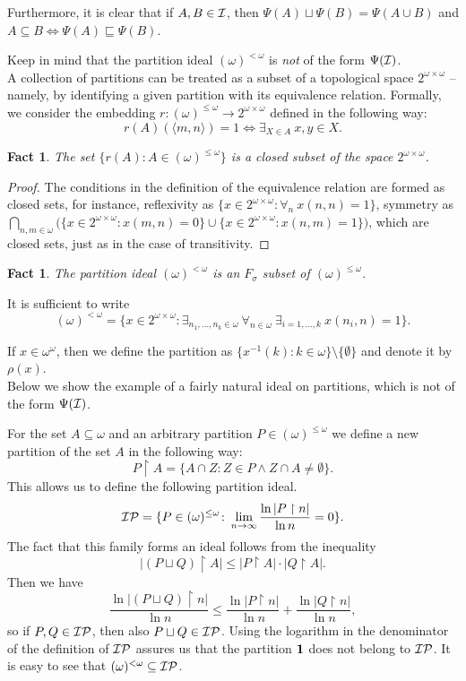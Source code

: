 \documentclass[12pt]{article}
\theoremstyle{plain}
\newtheorem{fact}[theorem]{Fact}
\theoremstyle{definition}
\theoremstyle{remark}
\newcommand{\cI}{{\cal I}}
\newcommand{\cP}{{\cal P}}
\newcommand{\Part}{(\omega)^{\leq\omega}}
\newcommand{\FinPart}{(\omega)^{<\omega}}
\begin{document}
Furthermore, it is clear that if $A,B\in\cI$, then
$\Psi(A)\sqcup \Psi(B) = \Psi(A \cup B)$
and $A \subseteq B \iff \Psi(A) \sqsubseteq \Psi(B)$.

Keep in mind that the partition ideal $\FinPart$ is \textit{not} of the form $\Psi(\cI)$.\\


A collection of partitions can be treated as a subset of a topological space $2^{\omega\times\omega}$ -- namely, by identifying a given partition with its equivalence relation. Formally, we consider the embedding $r\colon\Part\to 2^{\omega\times\omega}$ defined in the following way:
$$r(A)(\langle m,n\rangle) = 1 \iff \exists_{X\in A}\ x, y \in X.$$

\begin{fact}
The set $\{r(A)\colon A\in\Part\}$ is a closed subset of the space $2^{\omega\times\omega}$.
\end{fact}

\begin{proof}
The conditions in the definition of the equivalence relation are formed as closed sets, for instance, reflexivity as $\{x\in 2^{\omega\times\omega} \colon \forall_{n}\ x(n, n) = 1\}$, symmetry as 
$\bigcap_{n,m\in\omega} \big(\{x\in 2^{\omega\times\omega}\colon 
x(m,n) = 0 \} \cup \{x\in 2^{\omega\times\omega} 
\colon x(n,m) = 1\}\big)$, which are closed sets, just as in the case of transitivity.
\end{proof}

\begin{fact}
The partition ideal $\FinPart$ is an $F_{\sigma}$ subset of $\Part$.
\end{fact}
\proof
It is sufficient to write
\[\FinPart = \{
x\in 2^{\omega\times\omega} \colon
\exists_{n_1,\ldots,n_k\in\omega}\ 
\forall_{n\in\omega}\ \exists_{i=1,\ldots,k}\ 
x(n_i,n) = 1
\}.\]

If $x \in \omega^\omega$, then we define the partition as
$\{ x^{-1}(k)\colon k\in\omega \} \setminus \{\emptyset\}$ and denote it by $\rho(x)$.\\

Below we show the example of a fairly natural ideal on partitions, which is not of the form $\Psi(\cI)$.

For the set $A \subseteq \omega$ and an arbitrary partition $P\in\Part$ we define a new partition of the set $A$ in the following way:
$$P\restriction A = \{A \cap Z\colon
Z \in P \wedge Z\cap A \not=\emptyset\}.$$
This allows us to define the following partition ideal.
$$\cI\cP = \{P \in \Part\colon \lim_{n\to\infty} \frac{\ln |P \restriction n|}{\ln n} = 0\}.$$
The fact that this family forms an ideal follows from the inequality
$$|(P \sqcup Q) \restriction A| \leq |P \restriction A| \cdot |Q \restriction A|.$$
Then we have 
$$\frac{\ln |(P \sqcup Q) \restriction n|}{\ln n} \leq \frac{\ln |P \restriction n|}{\ln n} + \frac{\ln |Q \restriction n|}{\ln n},$$
so if $P,Q\in\cI\cP$, then also $P \sqcup Q\in\cI\cP$.
Using the logarithm in the denominator of the definition of $\cI\cP$ assures us that the partition ${\bf 1}$ does not belong to $\cI\cP$.
It is easy to see that $\FinPart\subseteq \cI\cP$. 
\end{document}
